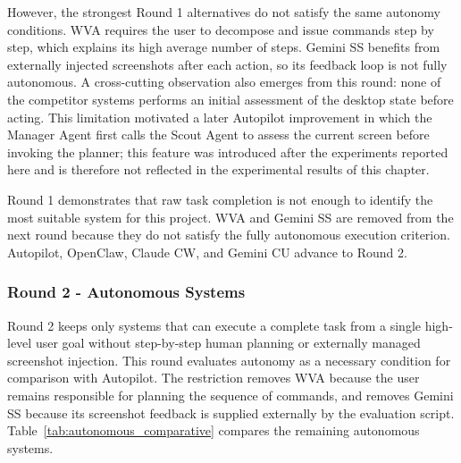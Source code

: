 However, the strongest Round 1 alternatives do not satisfy the same autonomy conditions. WVA requires the user to decompose and issue commands step by step, which explains its high average number of steps. Gemini SS benefits from externally injected screenshots after each action, so its feedback loop is not fully autonomous. A cross-cutting observation also emerges from this round: none of the competitor systems performs an initial assessment of the desktop state before acting. This limitation motivated a later Autopilot improvement in which the Manager Agent first calls the Scout Agent to assess the current screen before invoking the planner; this feature was introduced after the experiments reported here and is therefore not reflected in the experimental results of this chapter.

Round 1 demonstrates that raw task completion is not enough to identify the most suitable system for this project. WVA and Gemini SS are removed from the next round because they do not satisfy the fully autonomous execution criterion. Autopilot, OpenClaw, Claude CW, and Gemini CU advance to Round 2.

\subsubsection{Round 2 - Autonomous Systems}

Round 2 keeps only systems that can execute a complete task from a single high-level user goal without step-by-step human planning or externally managed screenshot injection. This round evaluates autonomy as a necessary condition for comparison with Autopilot. The restriction removes WVA because the user remains responsible for planning the sequence of commands, and removes Gemini SS because its screenshot feedback is supplied externally by the evaluation script. Table~\ref{tab:autonomous_comparative} compares the remaining autonomous systems.

